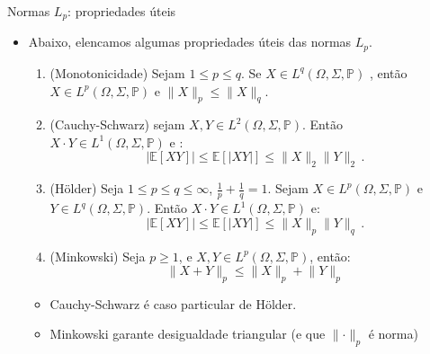 \documentclass[11pt]{beamer}
\begin{document}
	\begin{frame}{Normas $L_p$: propriedades úteis}
\begin{itemize}
	\item Abaixo, elencamos algumas propriedades úteis das normas $L_p$.
	\begin{lemma}
		\begin{enumerate}
			\item (Monotonicidade) Sejam $1 \leq p \leq q$. Se $X \in L^q(\Omega, \Sigma, \mathbb{P})$ , então $X \in L^p(\Omega, \Sigma, \mathbb{P})$ e $\lVert X \rVert_p \leq \lVert X \rVert_q$.
				\item (Cauchy-Schwarz) sejam $X,Y \in  L^2(\Omega, \Sigma, \mathbb{P})$. Então $X \cdot Y \in L^1(\Omega, \Sigma, \mathbb{P})$ e :
			$$|\mathbb{E}[XY]| \leq \mathbb{E}[|XY|] \leq \lVert X \rVert_2 \lVert Y \rVert_2\, .$$
			\item (H\"{o}lder) Seja $1 \leq p \leq q \leq \infty$, $\frac{1}{p}+\frac{1}{q} =1$. Sejam $X \in  L^p(\Omega, \Sigma, \mathbb{P})$ e  $Y \in  L^q(\Omega, \Sigma, \mathbb{P})$. Então $X \cdot Y \in L^1(\Omega, \Sigma, \mathbb{P})$  e: 
			$$|\mathbb{E}[XY] | \leq \mathbb{E}[|XY|]  \leq \lVert X \rVert_p   \lVert Y \rVert_q\, .   $$
			\item (Minkowski) Seja $p \geq 1$, e $X,Y \in  L^p(\Omega, \Sigma, \mathbb{P})$, então:
			$$\lVert X+Y\rVert_p \leq \lVert X\rVert_p+\lVert Y\rVert_p $$
		\end{enumerate}
	\end{lemma}
	\begin{itemize}
		\item Cauchy-Schwarz é caso particular de H\"{o}lder.
		\item Minkowski garante desigualdade triangular (e que $\lVert \cdot \rVert_p$ é norma)
	\end{itemize}
\end{itemize}
	\end{frame}
	
\end{document}

